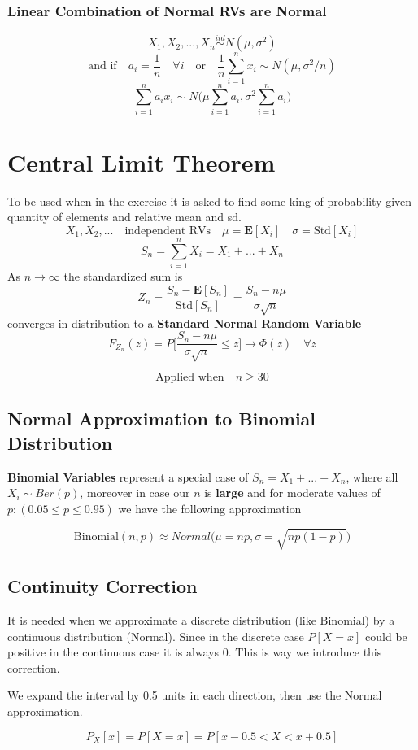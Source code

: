 \subsubsection{Linear Combination of Normal RVs are Normal}
\[X_1,X_2,...,X_n \stackrel{iid}{\sim} N(\mu, \sigma^2)\]
\[\text{and if} \quad a_i = \frac{1}{n} \quad \forall i \quad \text{or} \quad \frac{1}{n} \sum_{i = 1}^n x_i \sim N(\mu, \sigma^2/n)\]
\[\sum_{i = 1}^n a_ix_i \sim N\Big(\mu\sum_{i = 1}^n a_i, \sigma^2\sum_{i = 1}^n a_i\Big)\]

\section{Central Limit Theorem}
To be used when in the exercise it is asked to find some king of probability given quantity of elements and relative mean and sd.
\[X_1,X_2,... \quad \text{independent RVs} \quad \mu = \mathbf{E}[X_i] \quad \sigma = \text{Std}[X_i]\]
\[S_n = \sum_{i = 1}^n X_i = X_1 + ... + X_n\]
As \(n \rightarrow \infty\) the standardized sum is
\[Z_n = \frac{S_n - \mathbf{E}[S_n]}{\text{Std}[S_n]} = \frac{S_n - n\mu}{\sigma\sqrt{n}}\]
converges in distribution to a \textbf{Standard Normal Random Variable}
\[F_{Z_n}(z) = P\Big[\frac{S_n - n\mu}{\sigma\sqrt{n}} \leq z\Big] \rightarrow \Phi(z) \quad \forall z\]
\begin{tcolorbox}
\[\text{Applied when} \quad n \geq 30\]
\end{tcolorbox}

\subsection{Normal Approximation to Binomial Distribution}
\begin{tcolorbox}
\textbf{Binomial Variables} represent a special case of \(S_n = X_1+...+X_n\), where all \(X_i \sim Ber(p)\), moreover in case our \(n\) is \textbf{large} and for moderate values of \(p: (0.05 \leq p \leq 0.95)\) we have the following approximation 
\end{tcolorbox}
\[\text{Binomial}(n,p) \approx Normal\Big(\mu = np, \sigma = \sqrt{np(1 - p)}\Big)\]

\subsection{Continuity Correction}
\begin{tcolorbox}
It is needed when we approximate a discrete distribution (like Binomial) by a continuous distribution (Normal). Since in the discrete case \(P[X = x]\) could be positive in the continuous case it is always \(0\). This is way we introduce this correction.

We expand the interval by 0.5 units in each direction, then use the Normal approximation.
\end{tcolorbox}
\[P_X[x] = P[X = x] = P[x - 0.5 < X < x + 0.5]\]